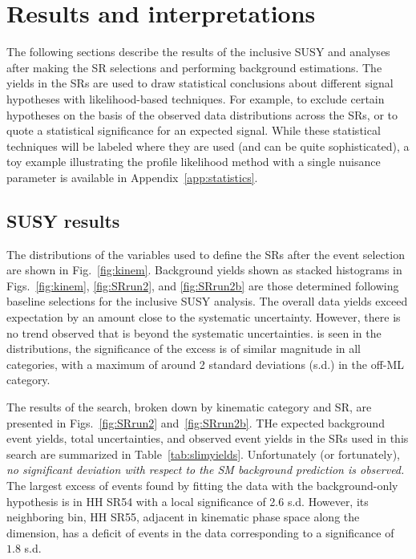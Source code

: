 \chapter{Results and interpretations}
\label{sec:results}

The following sections describe the results of the inclusive SUSY and \smft
analyses after making the SR selections and performing 
background estimations. The yields in the SRs are used to draw statistical
conclusions about different signal hypotheses with likelihood-based
techniques. For example, to exclude certain
hypotheses on the basis of the observed data distributions across the SRs,
or to quote a statistical significance for an expected signal.
While these statistical techniques will be labeled where they are used
(and can be quite sophisticated),
a toy example illustrating the profile likelihood method with a single nuisance
parameter is available in Appendix~\ref{app:statistics}.

\section{SUSY results}
\label{sec:ssresults}

The distributions of the variables used to define the SRs after the event selection are
shown in Fig.~\ref{fig:kinem}.
Background yields shown as stacked histograms in Figs.~\ref{fig:kinem}, \ref{fig:SRrun2}, and \ref{fig:SRrun2b} are
those determined following baseline selections for the inclusive SUSY analysis.
The overall data yields exceed expectation by an amount close to the systematic uncertainty.
However, there is no trend observed that is beyond the systematic uncertainties.
is seen in the distributions,
the significance of the excess is of similar magnitude in all categories, with a maximum of around 2 standard deviations (s.d.) in the off-\PZ ML category. 

The results of the search, broken down by kinematic category and SR,
are presented in Figs.~\ref{fig:SRrun2} and~\ref{fig:SRrun2b}.
THe expected background event yields, total uncertainties, and observed event yields in the SRs used in this search
are summarized in Table~\ref{tab:slimyields}.
Unfortunately (or fortunately), {\it no significant deviation with respect to the SM background prediction is observed.}
The largest excess of events found by fitting the data with the background-only
hypothesis is in HH SR54 with a local significance of 2.6 s.d.
However, its neighboring bin, HH SR55, adjacent in kinematic phase space along the \HT dimension, has a
deficit of events in the data corresponding to a
significance of $1.8$ s.d.

